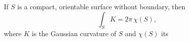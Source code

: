 \documentclass[12pt]{article}
\begin{document}
If $S$ is a compact, orientable surface without boundary, then
$$
\int_S K=2\pi\,\chi(S),
$$
where $K$ is the Gaussian curvature of $S$ and $\chi(S)$ its 
\end{document}
